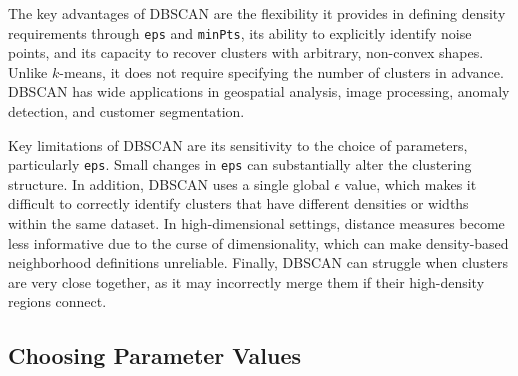 \medskip

The key advantages of DBSCAN are the flexibility it provides in defining density requirements through \texttt{eps} and \texttt{minPts}, its ability to explicitly identify noise points, and its capacity to recover clusters with arbitrary, non-convex shapes. Unlike $k$-means, it does not require specifying the number of clusters in advance. DBSCAN has wide applications in geospatial analysis, image processing, anomaly detection, and customer segmentation.

Key limitations of DBSCAN are its sensitivity to the choice of parameters, particularly \texttt{eps}. Small changes in \texttt{eps} can substantially alter the clustering structure. In addition, DBSCAN uses a single global $\epsilon$ value, which makes it difficult to correctly identify clusters that have different densities or widths within the same dataset. In high-dimensional settings, distance measures become less informative due to the curse of dimensionality, which can make density-based neighborhood definitions unreliable. Finally, DBSCAN can struggle when clusters are very close together, as it may incorrectly merge them if their high-density regions connect.

\bigskip

\subsection{Choosing Parameter Values}

\medskip

